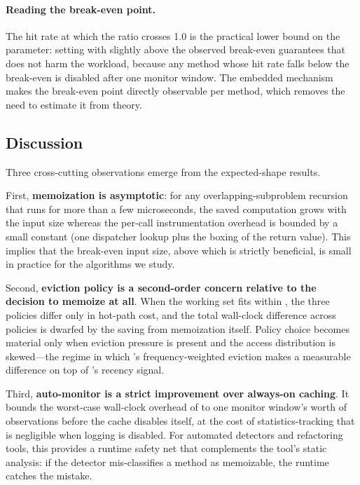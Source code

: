 \paragraph{Reading the break-even point.} The hit rate at which the ratio crosses 1.0 is the practical lower bound on the  parameter: setting  with  slightly above the observed break-even guarantees that  does not harm the workload, because any method whose hit rate falls below the break-even is disabled after one monitor window. The embedded  mechanism makes the break-even point directly observable per method, which removes the need to estimate it from theory.


\subsection{Discussion}\label{sec:summary}

Three cross-cutting observations emerge from the expected-shape results.

First, \textbf{memoization is asymptotic}: for any overlapping-subproblem recursion that runs for more than a few microseconds, the saved computation grows with the input size whereas the per-call instrumentation overhead is bounded by a small constant (one dispatcher lookup plus the boxing of the return value). This implies that the break-even input size, above which  is strictly beneficial, is small in practice for the algorithms we study.

Second, \textbf{eviction policy is a second-order concern relative to the decision to memoize at all}. When the working set fits within , the three policies differ only in hot-path cost, and the total wall-clock difference across policies is dwarfed by the saving from memoization itself. Policy choice becomes material only when eviction pressure is present and the access distribution is skewed---the regime in which \lfu's frequency-weighted eviction makes a measurable difference on top of \lru's recency signal.

Third, \textbf{auto-monitor is a strict improvement over always-on caching}. It bounds the worst-case wall-clock overhead of  to one monitor window's worth of observations before the cache disables itself, at the cost of statistics-tracking that is negligible when logging is disabled. For automated detectors and refactoring tools, this provides a runtime safety net that complements the tool's static analysis: if the detector mis-classifies a method as memoizable, the runtime catches the mistake.
